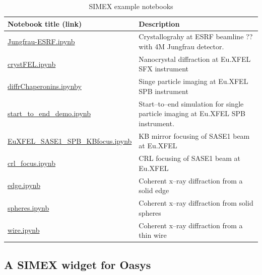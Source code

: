 \documentclass[10pt]{scrartcl}
\begin{document}
\begin{table}[ht]
  \centering
  \begin{tabular}{l|l}
    \textbf{Notebook title} (link) & \textbf{Description} \\
    \hline
    \href{https://github.com/PaNOSC-ViNYL/SimEx-notebooks/blob/main/ESRF-SerialCrystallography/Jungfrau-ESRF.ipynb}{Jungfrau-ESRF.ipynb} & Crystallograhy at ESRF beamline ?? with 4M Jungfrau detector. \\
    \href{https://github.com/PaNOSC-ViNYL/SimEx-notebooks/blob/main/SFX/crystFEL.ipynb}{crystFEL.ipynb} &  Nanocrystal diffraction at Eu.XFEL SFX instrument \cite{White2012} \\
    \href{https://github.com/PaNOSC-ViNYL/SimEx-notebooks/blob/main/SPB/diffrChaperonins.ipynb}{diffrChaperonins.ipynby} & Singe particle imaging at Eu.XFEL SPB instrument\\
    \href{https://github.com/PaNOSC-ViNYL/SimEx-notebooks/blob/main/s2e/start_to_end_demo.ipynb}{start\_to\_end\_demo.ipynb} & Start--to--end simulation for single particle imaging at Eu.XFEL SPB instrument. \\
    \href{https://github.com/PaNOSC-ViNYL/wavefrontDB/blob/main/examples/EuXFEL_SASE1_SPB_KBfocus.ipynb}{EuXFEL\_SASE1\_SPB\_KBfocus.ipynb} & KB mirror focusing of SASE1 beam at Eu.XFEL \\
    \href{https://github.com/PaNOSC-ViNYL/wavefrontDB/blob/main/examples/crl_focus.ipynb}{crl\_focus.ipynb} & CRL focusing of SASE1 beam at Eu.XFEL \\
    \href{https://github.com/PaNOSC-ViNYL/wavefrontDB/blob/main/examples/edge.ipynb}{edge.ipynb} & Coherent x--ray diffraction from a solid edge \\
    \href{https://github.com/PaNOSC-ViNYL/wavefrontDB/blob/main/examples/spheres.ipynb}{spheres.ipynb} & Coherent x--ray diffraction from solid spheres \\
    \href{https://github.com/PaNOSC-ViNYL/wavefrontDB/blob/main/examples/wire.ipynb}{wire.ipynb} & Coherent x--ray diffraction from a thin wire \\
    \hline
  \end{tabular}
  \caption{SIMEX example notebooks}
  \label{tab:simex-notebooks}
\end{table}

\subsection{A SIMEX widget for Oasys}
\label{sec:oasys-simex}
\end{document}
